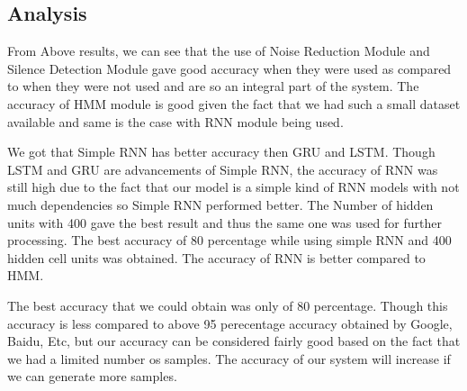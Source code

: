 \subsection{Analysis}

From Above results, we can see that the use of Noise Reduction Module and Silence Detection Module gave good accuracy when they were used as compared to when they were not used and are so an integral part of the system. The accuracy of HMM module is good given the fact that we had such a small dataset available and same is the case with RNN module being used.

We got that Simple RNN has better accuracy then GRU and LSTM. Though LSTM and GRU are advancements of Simple RNN, the accuracy of RNN was still high due to the fact that our model is a simple kind of RNN models with not much dependencies so Simple RNN performed better. The Number of hidden units with 400 gave the best result and thus the same one was used for further processing. The best accuracy of 80 percentage while
using simple RNN and 400 hidden cell units was obtained. The accuracy of RNN is better compared to HMM.

The best accuracy that we could obtain was only of 80 percentage. Though this accuracy is less compared to above 95 perecentage accuracy obtained by Google, Baidu, Etc, but our accuracy can be considered fairly good based on the fact that we had a limited number os samples. The accuracy of our system will increase if we can generate more samples.